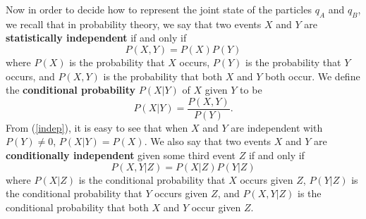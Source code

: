 Now in order to decide how to represent the joint state of the particles $q_A$ and $q_B$, we recall that  in probability theory, we say that two events $X$ and $Y$ are \textbf{statistically independent} if and only if 
\begin{equation}\label{indep}
    P(X, Y)=P(X)P(Y)
\end{equation}
where $P(X)$ %
%
is the probability that $X$ occurs, $P(Y)$ is the probability that $Y$ occurs, and $P(X, Y)$ is the probability that both $X$ and $Y$ both occur. We define the \textbf{conditional probability} $P(X|Y)$ %
%
of $X$ given $Y$ to be
\begin{equation}\label{conditionaprob}
P(X|Y)= \frac{P(X, Y)}{P(Y)}.
\end{equation}
From (\ref{indep}), it is easy to see that when $X$ and $Y$ are independent with $P(Y)\neq 0$, $P(X|Y)=P(X)$. We also say that two events $X$ and $Y$ are \textbf{conditionally independent} given some third event $Z$ if and only if 
\begin{equation}\label{indepcond}
P(X, Y|Z)=P(X|Z)P(Y|Z)
\end{equation} where $P(X|Z)$ is the conditional probability that $X$ occurs given $Z$, $P(Y|Z)$ is the conditional probability that $Y$ occurs given $Z$, and $P(X, Y|Z)$ is the conditional probability that both $X$ and $Y$  occur given $Z$.   

